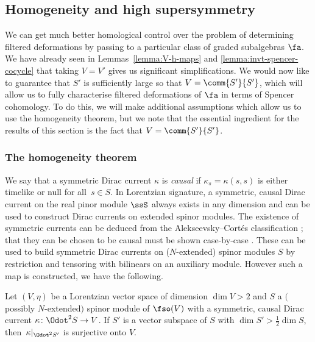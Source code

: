 \subsection{Homogeneity and high supersymmetry}
\label{sec:homogeneity}

We can get much better homological control over the problem of determining filtered deformations by passing to a particular class of graded subalgebras $\fa$. We have already seen in Lemmas~\ref{lemma:V-h-maps} and \ref{lemma:invt-spencer-cocycle} that taking $V=V'$ gives us significant simplifications. We would now like to guarantee that $S'$ is sufficiently large so that $V=\comm{S'}{S'}$, which will allow us to fully characterise filtered deformations of $\fa$ in terms of Spencer cohomology. To do this, we will make additional assumptions which allow us to use the homogeneity theorem, but we note that the essential ingredient for the results of this section is the fact that $V=\comm{S'}{S'}$.

\subsubsection{The homogeneity theorem}

We say that a symmetric Dirac current $\kappa$ is \emph{causal} if $\kappa_s=\kappa(s,s)$ is either timelike or null for all~${s\in S}$. In Lorentzian signature, a symmetric, causal Dirac current on the real pinor module $\ssS$ always exists in any dimension and can be used to construct Dirac currents on extended spinor modules. The existence of symmetric currents can be deduced from the Alekseevsky--Cort\'es classification \cite{Alekseevsky1997}; that they can be chosen to be causal must be shown case-by-case \cite{Hustler2016}. These can be used to build symmetric Dirac currents on ($N$-extended) spinor modules $S$ by restriction and tensoring with bilinears on an auxiliary module. However such a map is constructed, we have the following.

\begin{Theorem}\label{thm:homogeneity}
	Let $(V,\eta)$ be a Lorentzian vector space of dimension $\dim V>2$ and $S$ a $($possibly $N$-extended$)$ spinor module of $\fso(V)$ with a symmetric, causal Dirac current $\kappa\colon \Odot^2 S \to V$. If $S'$ is a vector subspace of $S$ with $\dim S'>\frac{1}{2}\dim S$, then~${\kappa|_{\Odot^2S'}}$ is surjective onto $V$.
\end{Theorem}

